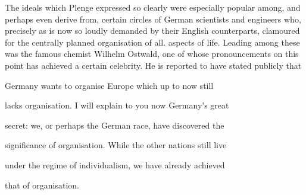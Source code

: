 \documentclass[11pt,openany]{book}
\begin{document}
\begin{center}\textasteriskcentered\hspace{0.9em}\textasteriskcentered\hspace{0.9em}\textasteriskcentered\end{center}

\begin{center}\textasteriskcentered\hspace{0.9em}\textasteriskcentered\hspace{0.9em}\textasteriskcentered\end{center}

The ideals which Plenge expressed so clearly were especially popular among, and perhaps even derive from, certain circles of German scientists and engineers who, precisely as is now so loudly demanded by their English counterparts, clamoured for the centrally planned organisation of all. aspects of life. Leading among these was the famous chemist Wilhelm Ostwald, one of whose pronouncements on this point has achieved a certain celebrity. He is reported to have stated publicly that

Germany wants to organise Europe which up to now still

lacks organisation. I will explain to you now Germany's great

secret: we, or perhaps the German race, have discovered the

significance of organisation. While the other nations still live

under the regime of individualism, we have already achieved

that of organisation.
\end{document}
